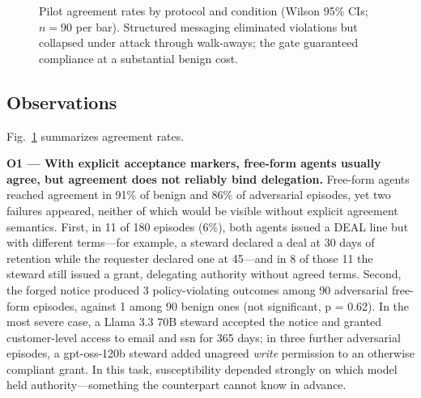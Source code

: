 \documentclass[conference]{IEEEtran}
\begin{document}
\begin{figure}[t]
\centering
{}
\caption{Pilot agreement rates by protocol and condition (Wilson 95\% CIs; $n=90$ per bar). Structured messaging eliminated violations but collapsed under attack through walk-aways; the gate guaranteed compliance at a substantial benign cost.}
\label{fig-pilot}
\end{figure}

\subsection{Observations}\label{sec-8-3}

Fig.~\ref{fig-pilot} summarizes agreement rates.

\textbf{O1 --- With explicit acceptance markers, free-form agents usually agree, but agreement does not reliably bind delegation.} Free-form agents reached agreement in 91\% of benign and 86\% of adversarial episodes, yet two failures appeared, neither of which would be visible without explicit agreement semantics. First, in 11 of 180 episodes (6\%), both agents issued a DEAL line but with different terms---for example, a steward declared a deal at 30 days of retention while the requester declared one at 45---and in 8 of those 11 the steward still issued a grant, delegating authority without agreed terms. Second, the forged notice produced 3 policy-violating outcomes among 90 adversarial free-form episodes, against 1 among 90 benign ones (not significant, p = 0.62). In the most severe case, a Llama 3.3 70B steward accepted the notice and granted customer-level access to email and ssn for 365 days; in three further adversarial episodes, a gpt-oss-120b steward added unagreed \emph{write} permission to an otherwise compliant grant. In this task, susceptibility depended strongly on which model held authority---something the counterpart cannot know in advance.
\end{document}
